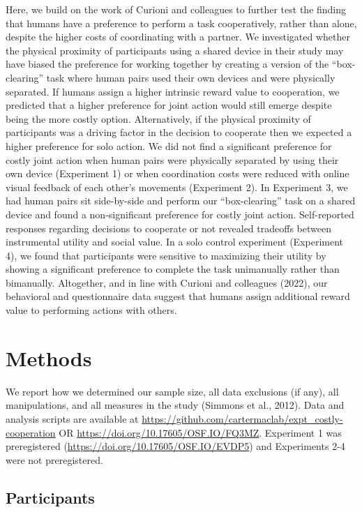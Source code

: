 \documentclass[
  11pt,
  letterpaper,
]{article}
\begin{document}
Here, we build on the work of Curioni and colleagues to further test the
finding that humans have a preference to perform a task cooperatively,
rather than alone, despite the higher costs of coordinating with a
partner. We investigated whether the physical proximity of participants
using a shared device in their study may have biased the preference for
working together by creating a version of the ``box-clearing'' task
where human pairs used their own devices and were physically separated.
If humans assign a higher intrinsic reward value to cooperation, we
predicted that a higher preference for joint action would still emerge
despite being the more costly option. Alternatively, if the physical
proximity of participants was a driving factor in the decision to
cooperate then we expected a higher preference for solo action. We did
not find a significant preference for costly joint action when human
pairs were physically separated by using their own device (Experiment 1)
or when coordination costs were reduced with online visual feedback of
each other's movements (Experiment 2). In Experiment 3, we had human
pairs sit side-by-side and perform our ``box-clearing'' task on a shared
device and found a non-significant preference for costly joint action.
Self-reported responses regarding decisions to cooperate or not revealed
tradeoffs between instrumental utility and social value. In a solo
control experiment (Experiment 4), we found that participants were
sensitive to maximizing their utility by showing a significant
preference to complete the task unimanually rather than bimanually.
Altogether, and in line with Curioni and colleagues (2022), our
behavioral and questionnaire data suggest that humans assign additional
reward value to performing actions with others.

\section{Methods}\label{methods}

We report how we determined our sample size, all data exclusions (if
any), all manipulations, and all measures in the study (Simmons et al.,
2012). Data and analysis scripts are available at
\url{https://github.com/cartermaclab/expt_costly-cooperation} OR
\url{https://doi.org/10.17605/OSF.IO/FQ3MZ}. Experiment 1 was
preregistered (\url{https://doi.org/10.17605/OSF.IO/EVDP5}) and
Experiments 2-4 were not preregistered.

\subsection{Participants}\label{participants}
\end{document}
